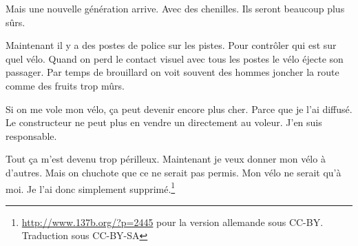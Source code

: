 Mais une nouvelle génération arrive. Avec des chenilles. Ils seront beaucoup plus sûrs.

Maintenant il y a des postes de police sur les pistes. Pour contrôler qui est sur quel vélo. Quand on perd le contact visuel avec tous les postes le vélo éjecte son passager. Par temps de
brouillard on voit souvent des hommes joncher la route comme des fruits trop mûrs.

Si on me vole mon vélo, ça peut devenir encore plus cher. Parce que je l’ai diffusé. Le constructeur ne peut plus en vendre un directement au voleur. J’en suis responsable.

Tout ça m’est devenu trop périlleux. Maintenant je veux donner mon vélo à d’autres. Mais on chuchote que ce ne serait pas permis. Mon vélo ne serait qu’à moi. Je l’ai donc simplement
supprimé.\footnote{\url{http://www.137b.org/?p=2445} pour la version allemande sous CC-BY. Traduction sous CC-BY-SA}
